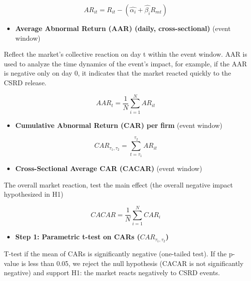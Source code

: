 \documentclass[
  letterpaper,
  DIV=11,
  numbers=noendperiod]{scrartcl}
\providecommand{\tightlist}{%
  \setlength{\itemsep}{0pt}\setlength{\parskip}{0pt}}
\begin{document}
\begin{equation}
AR_{it} = R_{it} - (\hat{\alpha_i} + \hat{\beta_i}R_{mt})
\end{equation}

\begin{itemize}
\tightlist
\item
  \textbf{Average Abnormal Return (AAR) (daily, cross-sectional)} (event
  window)
\end{itemize}

Reflect the market's collective reaction on day t within the event
window. AAR is used to analyze the time dynamics of the event's impact,
for example, if the AAR is negative only on day 0, it indicates that the
market reacted quickly to the CSRD release.

\begin{equation}
AAR_{t} = \frac{1}{N} \sum_{i=1}^{N}AR_{it}
\end{equation}

\begin{itemize}
\tightlist
\item
  \textbf{Cumulative Abnormal Return (CAR) per firm} (event window)
\end{itemize}

\begin{equation}
CAR_{\tau_1, \tau_2} = \sum_{t=\tau_1}^{\tau_2}AR_{it}
\end{equation}

\begin{itemize}
\tightlist
\item
  \textbf{Cross-Sectional Average CAR (CACAR)} (event window)
\end{itemize}

The overall market reaction, test the main effect (the overall negative
impact hypothesized in H1)

\begin{equation}
CACAR = \frac{1}{N} \sum_{i=1}^{N}CAR_i
\end{equation}

\begin{itemize}
\tightlist
\item
  \textbf{Step 1: Parametric t-test on CARs (\(CAR_{\tau_1, \tau_2}\))}
\end{itemize}

T-test if the mean of CARs is significantly negative (one-tailed test).
If the p-value is less than 0.05, we reject the null hypothesis (CACAR
is not significantly negative) and support H1: the market reacts
negatively to CSRD events.
\end{document}
